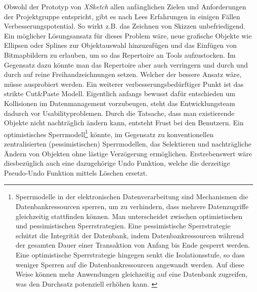 \medskip Obwohl der Prototyp von \emph{XSketch} allen anfänglichen Zielen und Anforderungen der Projektgruppe entspricht, gibt es nach Lees Erfahrungen in einigen Fällen Verbesserungspotential. So wirkt z.B. das Zeichnen von Skizzen unbefriedigend. Ein möglicher Lösungsansatz für dieses Problem wäre, neue grafische Objekte wie Ellipsen oder Splines zur Objektauswahl hinzuzufügen und das Einfügen von Bitmapbildern zu erlauben, um so das Repertoire an Tools aufzustocken. Im Gegensatz dazu könnte man das Repertoire aber auch verringern und durch und durch auf reine Freihandzeichnungen setzen. Welcher der bessere Ansatz wäre, müsse ausprobiert werden.
Ein weiterer verbesserungsbedürftiger Punkt ist das strikte Cut\&Paste Modell. Eigentlich anfangs bewusst dafür entschieden um Kollisionen im Datenmanagement vorzubeugen, steht das Entwicklungsteam dadurch vor Usabilityproblemen. Durch die Tatsache, dass man existierende Objekte nicht nachträglich ändern kann, entsteht Frust bei den Benutzern. Ein optimistisches Sperrmodell\footnote{Sperrmodelle in der elektronischen Datenverarbeitung sind Mechanismen die Datenbankressourcen sperren, um zu verhindern, dass mehrere Datenzugriffe gleichzeitig stattfinden können. Man unterscheidet zwischen optimistischen und pessimistischen Sperrstrategien. Eine pessimistische Sperrstrategie schützt die Integrität der Datenbank, indem Datenbankressourcen während der gesamten Dauer einer Transaktion von Anfang bis Ende gesperrt werden. Eine optimistische Sperrstrategie hingegen senkt die Isolationsstufe, so dass weniger Sperren auf die Datenbankressourcen angewandt werden. Auf diese Weise können mehr Anwendungen gleichzeitig auf eine Datenbank zugreifen, was den Durchsatz potenziell erhöhen kann. \citep{IBM:1996:Online}} könnte, im Gegensatz zu konventionellen zentralisierten (pessimistischen) Sperrmodellen, das Selektieren und nachträgliche Ändern von Objekten ohne lästige Verzögerung ermöglichen. Erstrebenswert wäre diesbezüglich auch eine dazugehörige Undo Funktion, welche die derzeitige Pseudo-Undo Funktion mittels Löschen ersetzt.
